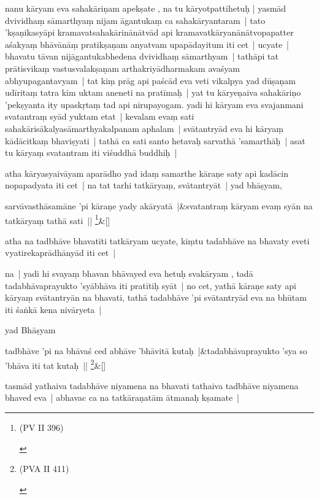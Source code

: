\documentclass[article,12pt,a4paper]{memoir}
\begin{document}
	  \pstart nanu kāryam eva sahakāriṇam apekṣate , na tu kāryotpattihetuḥ | yasmād dvividhaṃ sāmarthyaṃ nijam āgantukaṃ ca sahakāryantaram | tato 'kṣaṇikasyāpi kramavatsahakārinānātvād api kramavatkāryanānātvopapatter aśakyaṃ bhāvānāṃ pratikṣaṇam anyatvam upapādayitum iti cet | \label{thakur75-76.9} ucyate | bhavatu tāvan nijāgantukabhedena dvividhaṃ sāmarthyam | tathāpi tat prātisvikaṃ vastusvalakṣaṇam arthakriyādharmakam avaśyam abhyupagantavyam | tat kiṃ prāg api paścād eva veti vikalpya yad dūṣaṇam udīritaṃ tatra kim uktam aneneti na pratīmaḥ | \label{thakur75-76.12} yat tu kāryeṇaiva sahakāriṇo 'pekṣyanta ity upaskṛtaṃ tad api nirupayogam. yadi hi kāryam eva svajanmani svatantraṃ syād yuktam etat | kevalam evaṃ sati sahakārisākalyasāmarthyakalpanam aphalam | svātantryād eva hi kāryaṃ kādācitkaṃ bhaviṣyati | tathā ca sati santo hetavaḥ sarvathā 'samarthāḥ | asat tu kāryaṃ svatantram iti viśuddhā buddhiḥ |
	\pend
      

	  \pstart atha kāryasyaivāyam aparādho yad idaṃ samarthe kāraṇe saty api kadācin nopapadyata iti cet | na tat tarhi tatkāryaṃ, svātantryāt | \label{thakur75-76.18} yad bhāṣyam,
	\pend
      
	    
	    \stanza[\smallbreak]
	sarvāvasthāsamāne 'pi kāraṇe yady akāryatā |&svatantraṃ kāryam evaṃ syān na tatkāryaṃ tathā sati || \footnote{\begin{english}(PV II 396)\end{english}}\&[\smallbreak]


	

	  \pstart atha na tadbhāve bhavatīti tatkāryam ucyate, kiṃtu tadabhāve na bhavaty eveti vyatirekaprādhānyād iti cet |
	\pend
      

	  \pstart na | yadi hi svayaṃ bhavan bhāvayed eva hetuḥ svakāryam , tadā tadabhāvaprayukto 'syābhāva iti pratītiḥ syāt | no cet, yathā kāraṇe saty api kāryaṃ svātantryān na bhavati, tathā tadabhāve 'pi svātantryād eva na bhūtam iti śaṅkā kena nivāryeta |
	\pend
      

	  \pstart yad Bhāṣyam
	\pend
      
	    
	    \stanza[\smallbreak]
	tadbhāve 'pi na bhāvaś ced abhāve 'bhāvitā kutaḥ |&tadabhāvaprayukto 'sya so 'bhāva iti tat kutaḥ || \footnote{\begin{english}(PVA II 411)\end{english}}\&[\smallbreak]


	

	  \pstart tasmād yathaiva tadabhāve niyamena na bhavati tathaiva tadbhāve niyamena bhaved eva | abhavac ca na tatkāraṇatām ātmanaḥ kṣamate |
	\pend
      
\end{document}
